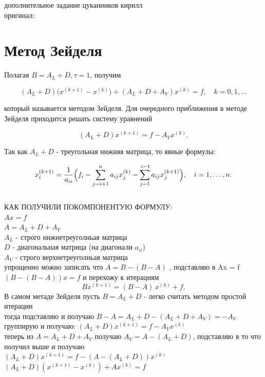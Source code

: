 \documentclass[12pt]{article}
\begin{document}
дополнительное задание цуканников кирилл \\
оригинал: \\
\section*{Метод Зейделя}

Полагая $B = A_{L} + D, \tau = 1$, получим

\begin{equation*}
(A_{L} + D)\bigl(x^{(k+1)} - x^{(k)}\bigr) + (A_{L} + D + A_{V})x^{(k)} = f, \quad k = 0,1,\dots
\end{equation*}

который называется методом Зейделя. Для очередного приближения в методе Зейделя приходится решать систему уравнений

\begin{equation*}
(A_{L} + D)x^{(k+1)} = f - A_{V}x^{(k)}.
\end{equation*}

Так как $A_{L} + D$ - треугольная нижняя матрица, то явные формулы:

\begin{equation*}
x_{i}^{(k+1)} = \frac{1}{a_{ii}}\Bigl( f_{i} - \sum_{j=i+1}^{n} a_{ij} x_{j}^{(k)} - \sum_{j=1}^{\,i-1} a_{ij} x_{j}^{(k+1)} \Bigr), \quad i = 1,\dots,n.
\end{equation*}
\\
КАК ПОЛУЧИЛИ ПОКОМПОНЕНТУЮ ФОРМУЛУ: \\
$Ax = f$ \\
$ A = A_L + D + A_V $ \\
$A_L$ - строго нижнетреуголньая матрица \\
$D$ - диагональная матрица (на диагонали $a_{ii}$)  \\
$A_V$ - строго верхнетреуголньая матрица \\
упрощенно можно записать что $A = B - (B - A)$ , подставляю в Ax = f \\
$( B - (B - A))x = f $  и перехожу к итерациям \\
\[
B x^{(k+1)} = (B-A)\,x^{(k)} + f.
\]
В самом метаде Зейделя пусть $B = A_L + D$ - легко считать методом простой итерации \\
тогда подставляю и получаю $ B - A = A_L + D  - (A_L+D+A_V)  = -A_V$ \\
группирую и получаю: $ (A_L+D)x^{(k+1)} = f-A_Vx^{(k)} $\\
теперь из $ A = A_L + D + A_V $ получаю $A_V = A-(A_L+D)$, подставляю в то что получил выше и получаю \\
$(A_L+D) x^{(k+1)} = f - (A-(A_L+D))x^{(k)} $ \\
$(A_L+D) ( x^{(k+1)} - x^{(k)}) + Ax^{(k)} = f $ \\
\end{document}
